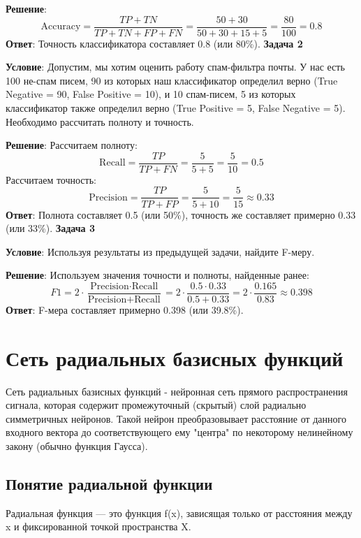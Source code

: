 \textbf{Решение}:
\[
    \text{Accuracy} = \frac{TP + TN}{TP + TN + FP + FN} = \frac{50 + 30}{50 + 30 + 15 + 5} = \frac{80}{100} = 0.8
\]
\textbf{Ответ}: Точность классификатора составляет 0.8 (или 80\%).
\newline
\newline
\textbf{Задача 2}

\textbf{Условие}: Допустим, мы хотим оценить работу спам-фильтра почты. У нас есть 100 не-спам писем, 90 из которых наш классификатор определил верно (True Negative = 90, False Positive = 10), и 10 спам-писем, 5 из которых классификатор также определил верно (True Positive = 5, False Negative = 5). Необходимо рассчитать полноту и точность.

\textbf{Решение}:
Рассчитаем полноту:
\[
    \text{Recall} = \frac{TP}{TP + FN} = \frac{5}{5 + 5} = \frac{5}{10} = 0.5
\]
Рассчитаем точность:
\[
    \text{Precision} = \frac{TP}{TP + FP} = \frac{5}{5 + 10} = \frac{5}{15} \approx 0.33
\]
\textbf{Ответ}: Полнота составляет 0.5 (или 50\%), точность же составляет примерно 0.33 (или 33\%).
\newline
\newline
\textbf{Задача 3}

\textbf{Условие}: Используя результаты из предыдущей задачи, найдите F-меру.

\textbf{Решение}:
Используем значения точности и полноты, найденные ранее:
\[
    F1 = 2 \cdot \frac{\text{Precision} \cdot \text{Recall}}{\text{Precision} + \text{Recall}} = 2 \cdot \frac{0.5 \cdot 0.33}{0.5 + 0.33} = 2 \cdot \frac{0.165}{0.83} \approx 0.398
\]
\textbf{Ответ}: F-мера составляет примерно 0.398 (или 39.8\%).

\section*{Сеть радиальных базисных функций}
Сеть радиальных базисных функций - нейронная сеть прямого распространения сигнала, которая содержит промежуточный (скрытый) слой радиально симметричных нейронов. Такой нейрон преобразовывает расстояние от данного входного вектора до соответствующего ему "центра" по некоторому нелинейному закону (обычно функция Гаусса).

\subsection*{Понятие радиальной функции}

Радиальная функция — это функция f(x), зависящая только от расстояния между x и фиксированной точкой пространства X.


